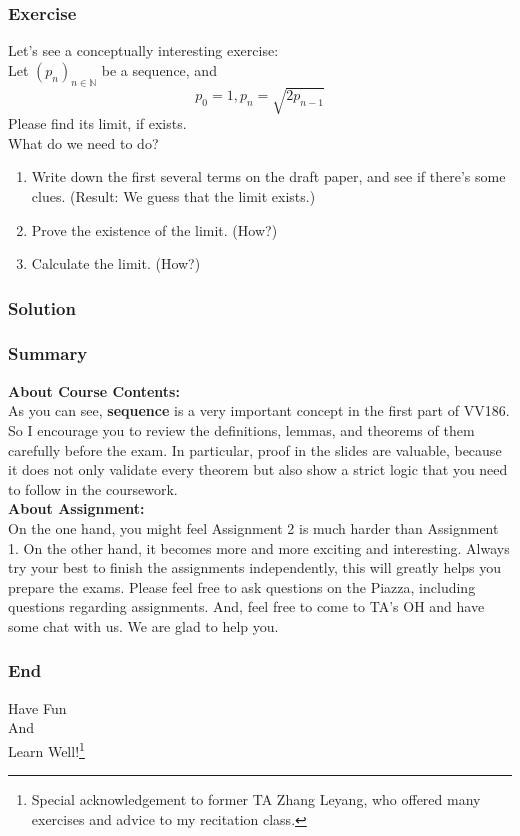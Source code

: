 \documentclass[10pt, t]{beamer}
\newcommand{\N}{\mathbb{N}}
\newcommand{\nullspace}{~\\[15pt]}
\begin{document}
\begin{frame}
    \frametitle{Exercise}

    Let's see a conceptually interesting exercise: \nullspace
    Let $(p_n)_{n\in\N}$ be a sequence, and 
    $$p_0=1, p_n=\sqrt{2 p_{n-1}}$$
    Please find its limit, if exists.\nullspace
    \pause
    What do we need to do?
    \begin{enumerate}
        \item Write down the first several terms on the draft paper, and see if there's some clues. (Result: We guess that the limit exists.)
        \item Prove the existence of the limit. (How?)
        \item Calculate the limit. (How?)
    \end{enumerate}
\end{frame}

\begin{frame}
    \frametitle{Solution}

    

\end{frame}

\begin{frame}
    \frametitle{Summary}
    \textbf{About Course Contents:}\\
    As you can see, \textbf{sequence} is a very important concept in the first part of VV186. So I encourage you to review the definitions, lemmas, and theorems of them carefully before the exam. In particular, proof in the slides are valuable, because it does not only validate every theorem but also show a strict logic that you need to follow in the coursework. \nullspace
    \textbf{About Assignment:}\\
    On the one hand, you might feel Assignment 2 is much harder than Assignment 1. On the other hand, it becomes more and more exciting and interesting. Always try your best to finish the assignments independently, this will greatly helps you prepare the exams. Please feel free to ask questions on the Piazza, including questions regarding assignments. And, feel free to come to TA's OH and have some chat with us. We are glad to help you.
\end{frame}



\begin{frame}
    \frametitle{End}
    \vspace{2.2cm}
    \begin{center}
        \Large
        Have Fun \\
        And \\
        Learn Well!\footnote[frame]{Special acknowledgement to former TA Zhang Leyang, who offered many exercises and advice to my recitation class.}
    \end{center}
\end{frame}
\end{document}
